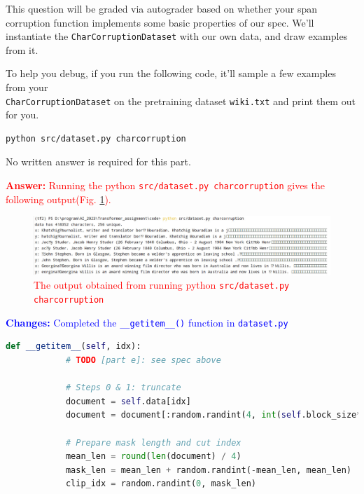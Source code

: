 \documentclass[letterpaper,12pt]{article}
\begin{document}
\begin{itemize}
		This question will be graded via autograder based on whether your span corruption function implements some basic properties of our spec.
		We'll instantiate the \texttt{CharCorruptionDataset} with our own data, and draw examples from it.
		
		To help you debug, if you run the following code, it'll sample a few examples from your \\ \texttt{CharCorruptionDataset} on the pretraining dataset \texttt{wiki.txt} and print them out for you.
		\begin{lstlisting}[language=bash]
			python src/dataset.py charcorruption
		\end{lstlisting}
		
		No written answer is required for this part.
		
		\textcolor{red}{\textbf{Answer:} Running the python \texttt{src/dataset.py charcorruption} gives the following output(Fig. \ref{fig: 2.e.result}).
			\begin{figure}[htbp] 
				\centering 
				\includegraphics[width=0.9\linewidth]{picture/2.e.result}
				\captionsetup{font=small}
				\caption{
					\label{fig: 2.e.result} %
					The output obtained from running python \texttt{src/dataset.py charcorruption}
				}
			\end{figure}
		}
		
		\textcolor{blue}{\textbf{Changes:}  Completed the \texttt{\_\_getitem\_\_()} function in \texttt{dataset.py}
		}
		\begin{lstlisting}[language=python, basicstyle=\small\ttfamily]
			def __getitem__(self, idx):
			# TODO [part e]: see spec above
			
			# Steps 0 & 1: truncate
			document = self.data[idx]
			document = document[:random.randint(4, int(self.block_size*7/8))]
			
			# Prepare mask length and cut index
			mean_len = round(len(document) / 4)
			mask_len = mean_len + random.randint(-mean_len, mean_len)
			clip_idx = random.randint(0, mask_len)
			

\end{lstlisting}
\end{itemize}
\end{document}
